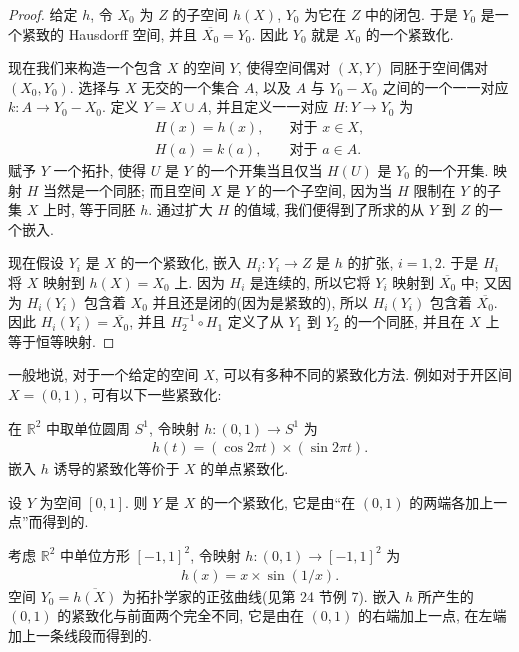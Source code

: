 \documentclass[../../main.tex]{subfiles}
\begin{document}
\begin{proof}
给定 $h$, 令 $X_0$ 为 $Z$ 的子空间 $h(X)$, $Y_0$ 为它在 $Z$ 中的闭包. 于是 $Y_0$ 是一个紧致的 Hausdorff 空间, 并且 $\overline{X_0}=Y_0$. 因此 $Y_0$ 就是 $X_0$ 的一个紧致化.

现在我们来构造一个包含 $X$ 的空间 $Y$, 使得空间偶对 $(X,Y)$ 同胚于空间偶对 $(X_0,Y_0)$. 选择与 $X$ 无交的一个集合 $A$, 以及 $A$ 与 $Y_0-X_0$ 之间的一个一一对应 $k\colon A\to Y_0-X_0$. 定义 $Y=X\cup A$, 并且定义一一对应 $H\colon Y\to Y_0$ 为
\begin{align*}
H(x)=h(x),&\quad \text{对于 }x\in X,\\
H(a)=k(a),&\quad \text{对于 }a\in A.
\end{align*}
赋予 $Y$ 一个拓扑, 使得 $U$ 是 $Y$ 的一个开集当且仅当 $H(U)$ 是 $Y_0$ 的一个开集. 映射 $H$ 当然是一个同胚; 而且空间 $X$ 是 $Y$ 的一个子空间, 因为当 $H$ 限制在 $Y$ 的子集 $X$ 上时, 等于同胚 $h$. 通过扩大 $H$ 的值域, 我们便得到了所求的从 $Y$ 到 $Z$ 的一个嵌入.

现在假设 $Y_i$ 是 $X$ 的一个紧致化, 嵌入 $H_i\colon Y_i\to Z$ 是 $h$ 的扩张, $i=1,2$. 于是 $H_i$ 将 $X$ 映射到 $h(X)=X_0$ 上. 因为 $H_i$ 是连续的, 所以它将 $Y_i$ 映射到 $\overline{X_0}$ 中; 又因为 $H_i(Y_i)$ 包含着 $X_0$ 并且还是闭的(因为是紧致的), 所以 $H_i(Y_i)$ 包含着 $\overline{X_0}$. 因此 $H_i(Y_i)=\overline{X_0}$, 并且 $H_2^{-1}\circ H_1$ 定义了从 $Y_1$ 到 $Y_2$ 的一个同胚, 并且在 $X$ 上等于恒等映射.
\end{proof}

一般地说, 对于一个给定的空间 $X$, 可以有多种不同的紧致化方法. 例如对于开区间 $X=(0,1)$, 可有以下一些紧致化:

\begin{examples}
在 $\mathbb{R}^2$ 中取单位圆周 $S^1$, 令映射 $h\colon(0,1)\to S^1$ 为
\begin{align*}
h(t)=(\cos 2\pi t)\times(\sin 2\pi t).
\end{align*}
嵌入 $h$ 诱导的紧致化等价于 $X$ 的单点紧致化.
\end{examples}

\begin{examples}
设 $Y$ 为空间 $[0,1]$. 则 $Y$ 是 $X$ 的一个紧致化, 它是由``在 $(0,1)$ 的两端各加上一点''而得到的.
\end{examples}

\begin{examples}
考虑 $\mathbb{R}^2$ 中单位方形 $[-1,1]^2$, 令映射 $h\colon(0,1)\to[-1,1]^2$ 为
\begin{align*}
h(x)=x\times\sin(1/x).
\end{align*}
空间 $Y_0=\overline{h(X)}$ 为拓扑学家的正弦曲线(见第 24 节例 7). 嵌入 $h$ 所产生的 $(0,1)$ 的紧致化与前面两个完全不同, 它是由在 $(0,1)$ 的右端加上一点, 在左端加上一条线段而得到的.
\end{examples}
\end{document}
